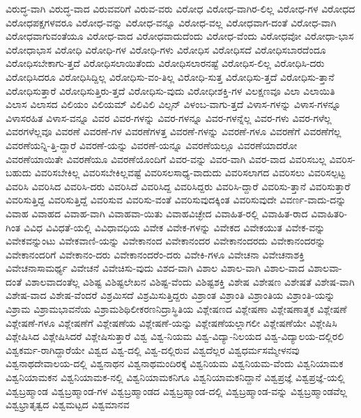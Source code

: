 {ವಿರುದ್ಧ-ವಾಗಿ
ವಿರುದ್ಧ-ವಾದ
ವಿರುವವರಿಗೆ
ವಿರುವ-ವರು
ವಿರೋಧ
ವಿರೋಧ-ವಾಗಿರ-ಲಿಲ್ಲ
ವಿರೋಧ-ಗಳ
ವಿರೋಧದ
ವಿರೋಧಪಕ್ಷಗಳವರೂ
ವಿರೋಧ-ವನ್ನು
ವಿರೋಧ-ವನ್ನೂ
ವಿರೋಧ-ವಲ್ಲ
ವಿರೋಧವಾಗ-ದಂತೆ
ವಿರೋಧ-ವಾಗಿ
ವಿರೋಧವಾಗುವಂತೆಯೂ
ವಿರೋಧ-ವಾದ
ವಿರೋಧವಾದುದೆಂದು
ವಿರೋಧ-ವೆಂದು
ವಿರೋಧವೋ
ವಿರೋಧಾ-ಭಾಸ
ವಿರೋಧಾಭಾಸ
ವಿರೋಧಿ
ವಿರೋಧಿ-ಗಳ
ವಿರೋಧಿ-ಗಳು
ವಿರೋಧಿಸ
ವಿರೋಧಿಸದೆ
ವಿರೋಧಿಸಬಾರದೆಂದೂ
ವಿರೋಧಿಸಬೇಕಾಗು-ತ್ತದೆ
ವಿರೋಧಿಸಲಾಯಿತೆಂದು
ವಿರೋಧಿಸಲಾರನಷ್ಟೆ
ವಿರೋಧಿಸ-ಲಿಲ್ಲ
ವಿರೋಧಿಸಿ-ದರು
ವಿರೋಧಿಸಿದರೂ
ವಿರೋಧಿಸಿದ್ದಿಲ್ಲ
ವಿರೋಧಿಸು-ವಂ-ತಿಲ್ಲ
ವಿರೋಧಿ-ಸುತ್ತ
ವಿರೋಧಿಸು-ತ್ತದೆ
ವಿರೋಧಿಸು-ತ್ತಾನೆ
ವಿರೋಧಿಸುತ್ತಾರೆ
ವಿರೋಧಿಸುತ್ತಿರು-ತ್ತದೆ
ವಿರೋಧಿಸು-ವುದು
ವಿರೋಧೀಶಕ್ತಿ-ಗಳ
ವಿಲಕ್ಷಣವೂ
ವಿಲಾ
ವಿಲಾಯಿತಿ
ವಿಲಾಸ
ವಿಲಾಸದ
ವಿಲಿಯಂ
ವಿಲಿಯಮ್
ವಿಲಿವಿಲಿ
ವಿಲ್ಸನ್
ವಿಳಂಬ-ವಾಗು-ತ್ತದೆ
ವಿಳಾಸ-ಗಳನ್ನು
ವಿಳಾಸ-ಗಳನ್ನೂ
ವಿಳಾಸರಹಿತ
ವಿಳಾಸ-ವನ್ನೂ
ವಿವರ
ವಿವರ-ಗಳನ್ನು
ವಿವರ-ಗಳನ್ನೂ
ವಿವರ-ಗಳನ್ನೆಲ್ಲ
ವಿವರ-ಗಳು
ವಿವರ-ಗಳೆಲ್ಲ
ವಿವರಗಳೆಲ್ಲವೂ
ವಿವರಣೆ
ವಿವರಣೆ-ಗಳ
ವಿವರಣೆಗಳತ್ತ
ವಿವರಣೆ-ಗಳನ್ನು
ವಿವರಣೆ-ಗಳೂ
ವಿವರಣೆಗೆ
ವಿವರಣೆಗೆಲ್ಲ
ವಿವರಣೆಯನ್ನಿ-ತ್ತಿ-ದ್ದಾರೆ
ವಿವರಣೆ-ಯನ್ನು
ವಿವರಣೆ-ಯನ್ನೂ
ವಿವರಣೆಯಲ್ಲೂ
ವಿವರಣೆಯಾದರೋ
ವಿವರಣೆಯಾಯಿತೇ
ವಿವರಣೆಯೂ
ವಿವರಣೆಯೊಂದಿಗೆ
ವಿವರ-ವನ್ನು
ವಿವರ-ವಾಗಿ
ವಿವರ-ವಾದ
ವಿವರಿಸಬಲ್ಲ
ವಿವರಿಸ-ಬಹುದು
ವಿವರಿಸಬೇಕಿಲ್ಲ
ವಿವರಿಸಬೇಕಿಲ್ಲವಷ್ಟೆ
ವಿವರಿಸಲಸಾಧ್ಯ-ವಾದುದು
ವಿವರಿಸಲಾಗದ
ವಿವರಿಸಲು
ವಿವರಿಸಲ್ಪಟ್ಟ
ವಿವರಿಸಿ
ವಿವರಿಸಿದ
ವಿವರಿಸಿ-ದರು
ವಿವರಿಸಿದೆ
ವಿವರಿಸಿದ್ದ
ವಿವರಿಸಿದ್ದರು
ವಿವರಿಸಿ-ದ್ದಾರೆ
ವಿವರಿಸು-ತ್ತಾನೆ
ವಿವರಿಸುತ್ತಾರೆ
ವಿವರಿಸುತ್ತಿದ್ದ
ವಿವರಿಸುತ್ತಿದ್ದೆ
ವಿವರಿಸುವ
ವಿವರಿಸು-ವಂತೆ
ವಿವರಿಸುವುದಕ್ಕಿಂತ
ವಿವರಿಸುವುದೇ
ವಿವರ್ಣ-ವಾದು-ದನ್ನು
ವಿವಾಹ
ವಿವಾಹದ
ವಿವಾಹ-ವಾಗಿ
ವಿವಾಹವಾ-ಯಿತು
ವಿವಾಹವಿಚ್ಛೇದ
ವಿವಾಹಿತ-ರಲ್ಲಿ
ವಿವಾಹಿತ-ರಾದ
ವಿವಾಹಿತರಿ-ಗಿಂತ
ವಿವಿಧ
ವಿವಿಧತೆ-ಯಲ್ಲಿ
ವಿವಿಧಾವಧಿಯ
ವಿವೇಕ
ವಿವೇಕ-ಗಳನ್ನು
ವಿವೇಕದ
ವಿವೇಕಯುತ
ವಿವೇಕ-ವನ್ನು
ವಿವೇಕವನ್ನುಂಟು
ವಿವೇಕವಾಣಿ-ಯನ್ನು
ವಿವೇಕಾನಂದ
ವಿವೇಕಾನಂದರ
ವಿವೇಕಾನಂದರದು
ವಿವೇಕಾನಂದರನ್ನು
ವಿವೇಕಾನಂದರಿಗೆ
ವಿವೇಕಾನಂ-ದರು
ವಿವೇಕಾನಂದರೆಂ-ದರು
ವಿವೇಕಿ-ಗಳೂ
ವಿವೇಚನಾ
ವಿವೇಚನಾಶಕ್ತಿ
ವಿವೇಚನಾಸಾಮರ್ಥ್ಯ
ವಿವೇಚನೆ
ವಿವೇಚಿಸು-ವುದು
ವಿಶದ-ವಾಗಿ
ವಿಶಾಲ
ವಿಶಾಲ-ವಾಗಿ
ವಿಶಾಲ-ವಾದ
ವಿಶಾಲವಾ-ದಂತೆ
ವಿಶಾಲವಾದಂತೆಲ್ಲ
ವಿಶಿಷ್ಟ
ವಿಶಿಷ್ಟಲೇಖನ
ವಿಶಿಷ್ಟ-ವೆಂದು
ವಿಶಿಷ್ಟಶಕ್ತಿ
ವಿಶೇಷ
ವಿಶೇಷಣ
ವಿಶೇಷತೆ
ವಿಶೇಷ-ವಾಗಿ
ವಿಶೇಷ-ವಾದ
ವಿಶೇಷ-ವೆಂದರೆ
ವಿಶ್ರಮಿಸದೆ
ವಿಶ್ರಮಿಸುತ್ತಿದ್ದರು
ವಿಶ್ರಾಂತ
ವಿಶ್ರಾಂತಿ
ವಿಶ್ರಾಂತಿಯ
ವಿಶ್ರಾಂತಿ-ಯನ್ನು
ವಿಶ್ರಾಮ
ವಿಶ್ರಾಮಭಾವನೆಯ
ವಿಶ್ರಾಮಶಿಥಿಲೀಕರಣನಿದ್ರಾಸ್ಥಿತಿಯ
ವಿಶ್ಲೇಷಣದ
ವಿಶ್ಲೇಷಣಾ
ವಿಶ್ಲೇಷಣಾತ್ಮಕ
ವಿಶ್ಲೇಷಣೆ
ವಿಶ್ಲೇಷಣೆ-ಗಳೂ
ವಿಶ್ಲೇಷಣೆಗೆ
ವಿಶ್ಲೇಷಣೆಯ
ವಿಶ್ಲೇಷಣೆ-ಯನ್ನು
ವಿಶ್ಲೇಷಣೆಯಲ್ಲಾಗಲೀ
ವಿಶ್ಲೇಷಣೆಯೇ
ವಿಶ್ಲೇಷಿಸಿ
ವಿಶ್ಲೇಷಿಸಿದ
ವಿಶ್ಲೇಷಿಸಿದರೆ
ವಿಶ್ಲೇಷಿಸುತ್ತಾರೆ
ವಿಶ್ವ
ವಿಶ್ವ-ನಿಯಮ
ವಿಶ್ವ-ವಿದ್ಯಾ-ನಿಲಯದ
ವಿಶ್ವ-ವಿದ್ಯಾಲಯ-ದಲ್ಲಿರಲಿ
ವಿಶ್ವಕರ್ಮ-ರಾಗಿದ್ದಾರೆಯೇ
ವಿಶ್ವದ
ವಿಶ್ವ-ದಲ್ಲಿ
ವಿಶ್ವ-ದಲ್ಲಿರುವ
ವಿಶ್ವದೆಲ್ಲರ
ವಿಶ್ವಧರ್ಮಸಮ್ಮೇಳನವು
ವಿಶ್ವನಾಥದೇವಾಲಯ-ದಲ್ಲಿ
ವಿಶ್ವನಾಥನ
ವಿಶ್ವನಾಥಮಂದಿರಕ್ಕೆ
ವಿಶ್ವನಿಯಮ
ವಿಶ್ವನಿಯಮ-ವೆಂದು
ವಿಶ್ವನಿಯಾಮಕ
ವಿಶ್ವನಿಯಾಮಕನ
ವಿಶ್ವನಿಯಾಮಕ-ನಲ್ಲಿ
ವಿಶ್ವನಿಯಾಮಕನಿಗೂ
ವಿಶ್ವನಿಯಾಮಕನಿದ್ದಾನೆ
ವಿಶ್ವಪ್ರಜ್ಞೆ
ವಿಶ್ವಪ್ರಜ್ಞೆ-ಯಲ್ಲಿ
ವಿಶ್ವಬ್ರಹ್ಮಾಂಡ
ವಿಶ್ವಬ್ರಹ್ಮಾಂಡ-ಗಳ
ವಿಶ್ವಬ್ರಹ್ಮಾಂಡದ
ವಿಶ್ವಬ್ರಹ್ಮಾಂಡ-ದಲ್ಲಿ
ವಿಶ್ವಬ್ರಹ್ಮಾಂಡ-ವನ್ನು
ವಿಶ್ವಬ್ರಹ್ಮಾಂಡವೆಲ್ಲ
ವಿಶ್ವಭ್ರಾತೃತ್ವದ
ವಿಶ್ವಮಟ್ಟದ
ವಿಶ್ವಮಾನವ
}
